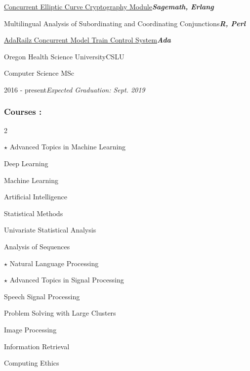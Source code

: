 \documentclass{article}
\newenvironment{mylist}[2]{
  \subsubsection*{#1}
  \begin{multicols}{#2}
  \small
  \begin{list}{}{}
   \setlength{\topsep}{0pt}
   \setlength{\itemsep}{1pt}
   \setlength{\parskip}{0pt}
   \setlength{\parsep}{0pt}}{\end{list}\end{multicols}\normalsize}
\newenvironment{**mylist}[2]{
  \subsubsection*{#1\hfill\small#2}
  \small
  \begin{list}{}{}
   \setlength{\topsep}{0pt}
   \setlength{\itemsep}{1pt}
   \setlength{\parskip}{0pt}
   \setlength{\parsep}{0pt}}{\end{list}\normalsize}
\newenvironment{*mylist}[2]{
  \subsection*{#1\hfill#2}
  \small
  \begin{list}{}{}
   \setlength{\topsep}{0pt}
   \setlength{\itemsep}{1pt}
   \setlength{\parskip}{0pt}
   \setlength{\parsep}{0pt}}{\end{list}\normalsize}
\newcommand{\LUx}[1]{{\bf\em #1}}
\begin{document}
\begin{**mylist}{}{}
\item \href{https://github.com/probinso/ecc}{Concurrent Elliptic Curve Cryptography Module}\hfill\LUx{Sagemath, Erlang}
\item Multilingual Analysis of Subordinating and Coordinating Conjunctions\hfill\LUx{R, Perl}
\item \href{https://github.com/probinso/adarailz}{AdaRailz Concurrent Model Train Control System}\hfill\LUx{Ada}
\end{**mylist}
\normalsize


\begin{*mylist}{Oregon Health Science University}{CSLU}
\item Computer Science MSc
\item 2016 - present\hfill {\em Expected Graduation: Sept. 2019}
\end{*mylist}

\begin{mylist}{Courses :}{2}
\item[$\star$] Advanced Topics in Machine Learning
\item Deep Learning
\item Machine Learning
\item Artificial Intelligence
\item Statistical Methods
\item Univariate Statistical Analysis
\item Analysis of Sequences
\item[$\star$] Natural Language Processing
\item[$\star$] Advanced Topics in Signal Processing
\item Speech Signal Processing
\item Problem Solving with Large Clusters
\item Image Processing
\item Information Retrieval
\item Computing Ethics
\end{mylist}
\end{document}
